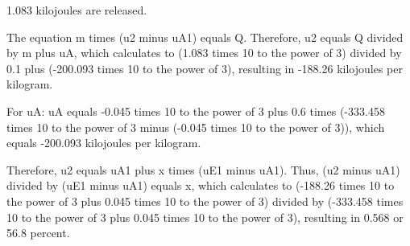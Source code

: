 1.083 kilojoules are released.

The equation m times (u2 minus uA1) equals Q. Therefore, u2 equals Q divided by m plus uA, which calculates to (1.083 times 10 to the power of 3) divided by 0.1 plus (-200.093 times 10 to the power of 3), resulting in -188.26 kilojoules per kilogram.

For uA: uA equals -0.045 times 10 to the power of 3 plus 0.6 times (-333.458 times 10 to the power of 3 minus (-0.045 times 10 to the power of 3)), which equals -200.093 kilojoules per kilogram.

Therefore, u2 equals uA1 plus x times (uE1 minus uA1). Thus, (u2 minus uA1) divided by (uE1 minus uA1) equals x, which calculates to (-188.26 times 10 to the power of 3 plus 0.045 times 10 to the power of 3) divided by (-333.458 times 10 to the power of 3 plus 0.045 times 10 to the power of 3), resulting in 0.568 or 56.8 percent.